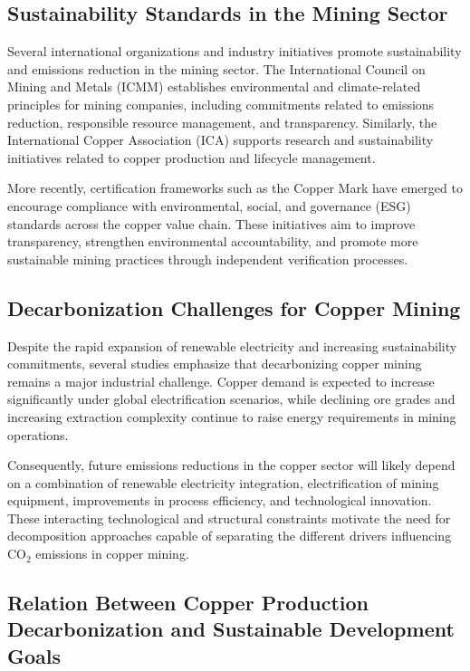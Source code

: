 \subsection{Sustainability Standards in the Mining Sector}

Several international organizations and industry initiatives promote sustainability and emissions reduction in the mining sector. The International Council on Mining and Metals (ICMM) establishes environmental and climate-related principles for mining companies, including commitments related to emissions reduction, responsible resource management, and transparency. Similarly, the International Copper Association (ICA) supports research and sustainability initiatives related to copper production and lifecycle management.

More recently, certification frameworks such as the Copper Mark have emerged to encourage compliance with environmental, social, and governance (ESG) standards across the copper value chain. These initiatives aim to improve transparency, strengthen environmental accountability, and promote more sustainable mining practices through independent verification processes.


\subsection{Decarbonization Challenges for Copper Mining}

Despite the rapid expansion of renewable electricity and increasing sustainability commitments, several studies emphasize that decarbonizing copper mining remains a major industrial challenge. Copper demand is expected to increase significantly under global electrification scenarios, while declining ore grades and increasing extraction complexity continue to raise energy requirements in mining operations.

Consequently, future emissions reductions in the copper sector will likely depend on a combination of renewable electricity integration, electrification of mining equipment, improvements in process efficiency, and technological innovation. These interacting technological and structural constraints motivate the need for decomposition approaches capable of separating the different drivers influencing CO$_2$ emissions in copper mining.

\subsection{Relation Between Copper Production Decarbonization and Sustainable Development Goals}

